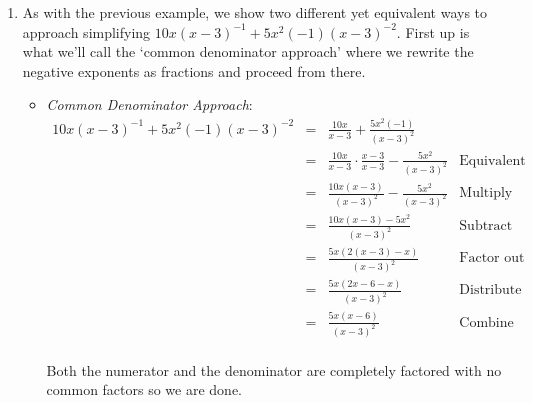 \documentclass{ximera}
\begin{document}
\begin{example}
\begin{explanation}
\begin{enumerate}
\[\begin{array}{rclr}
2t^{-3} - (3t)^{-2} & = & 2t^{-3} - 3^{-2} t^{-2} &  \text{Properties of Exponents} \\  
                    & = & 3^{-2} t^{-3} (2(3)^2 - t^{1}) & \text{Factor} \\  
										& = & \frac{1}{3^2} \frac{1}{t^3} (18 - t) & \text{Rewrite}\\  
										& = & \frac{18-t}{9t^3} & \text{Multiply} \\ \end{array}\]
																							
While both ways are valid, one may be more of a natural fit than the other depending on the circumstances and temperament of the student.

\item As with the previous example, we show two different yet equivalent ways to approach simplifying $10x(x-3)^{-1} + 5x^2(-1)(x-3)^{-2}$. First up is what we'll call the `common denominator approach' where we rewrite the negative exponents as fractions and proceed from there.

\begin{itemize}

\item  \textit{Common Denominator Approach}: \[ \begin{array}{rclr}

10x(x-3)^{-1} + 5x^2(-1)(x-3)^{-2} & = & \frac{10x}{x-3} + \frac{5x^2(-1)}{(x-3)^2} & \\  
                                   & = & \frac{10x}{x-3} \cdot \frac{x-3}{x-3} - \frac{5x^2}{(x-3)^2} & \text{Equivalent Fractions} \\  
																	 & = & \frac{10x(x-3)}{(x-3)^2} - \frac{5x^2}{(x-3)^2} & \text{Multiply} \\  
																	 & = & \frac{10x(x-3) - 5x^2}{(x-3)^2} & \text{Subtract} \\  
																	 & = & \frac{5x(2(x-3) - x)}{(x-3)^2} & \text{Factor out G.C.F.} \\  
																	 & = & \frac{5x(2x-6-x)}{(x-3)^2} & \text{Distribute} \\  
																	 & = & \frac{5x(x-6)}{(x-3)^2} & \text{Combine like terms} \\
																	
\end{array} \]

Both the numerator and the denominator are completely factored with no common factors so we are done.


\end{itemize}
\end{enumerate}
\end{explanation}
\end{example}
\end{document}
